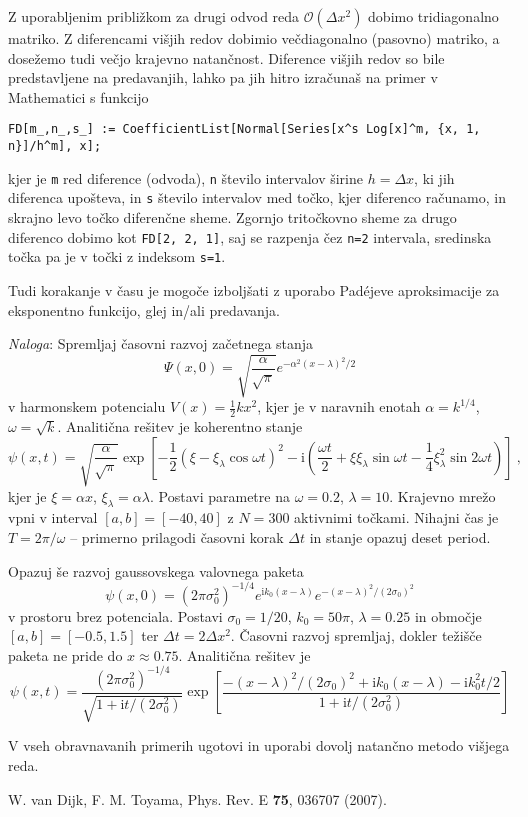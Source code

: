 \documentclass[slovene,11pt,a4paper]{article}
\newcommand{\ii}{\mathrm{i}}
\begin{document}
Z uporabljenim približkom za drugi odvod reda $\mathcal{O}(\Delta x^2)$ dobimo tridiagonalno matriko. Z diferencami višjih redov dobimio večdiagonalno (pasovno) matriko, a dosežemo tudi večjo krajevno natančnost. Diference višjih redov so bile predstavljene na predavanjih, lahko 
pa jih hitro izračunaš na primer v Mathematici s funkcijo
\begin{center}
  \tt FD[m_,n_,s_] := CoefficientList[Normal[Series[x\string^s Log[x]\string^m, \{x, 1, n\}]/h\string^m], x];
\end{center}
kjer je {\tt m} red diference (odvoda), {\tt n} število intervalov širine $h=\Delta x$, ki jih diferenca upošteva, in {\tt s} število intervalov med točko, kjer diferenco računamo, in skrajno levo točko diferenčne sheme. Zgornjo tritočkovno sheme za drugo diferenco dobimo kot {\tt FD[2, 2, 1]}, saj se razpenja čez {\tt n=2} intervala, sredinska točka pa je v točki z indeksom {\tt s=1}. 

Tudi korakanje v času je mogoče izboljšati z uporabo Pad\'ejeve aproksimacije za eksponentno funkcijo, glej \cite{dijk} in/ali predavanja. 


{\it Naloga\/}: Spremljaj časovni razvoj začetnega stanja
\begin{equation*}
  \Psi(x,0)=\sqrt{\frac{\alpha}{\sqrt{\pi}}} e^{-\alpha^2 (x-\lambda)^2/2}
\end{equation*}
v harmonskem potencialu $V(x)=\frac12 kx^2$, kjer je v naravnih enotah $\alpha=k^{1/4}$, $\omega=\sqrt{k}$. Analitična rešitev je koherentno stanje
\begin{equation*}
  \psi(x,t)=\sqrt{\frac{\alpha}{\sqrt{\pi}}} \exp\left[-\frac12 \left(\xi-\xi_\lambda \cos\omega t\right)^2 - \ii \left(\frac{\omega t}{2}+\xi\xi_\lambda \sin\omega t - \frac14 \xi_\lambda^2 \sin 2 \omega t\right)\right]\>,
\end{equation*}
kjer je $\xi=\alpha x$, $\xi_\lambda=\alpha \lambda$. Postavi parametre na $\omega=0.2$, $\lambda=10$. Krajevno mrežo vpni v interval $[a,b]=[-40,40]$ z $N=300$ aktivnimi točkami. Nihajni čas je $T=2\pi/\omega$ -- primerno prilagodi časovni korak $\Delta t$ in stanje opazuj deset period.

Opazuj še razvoj gaussovskega valovnega paketa
\begin{equation*}
  \psi(x,0)=(2\pi \sigma_0^2)^{-1/4} e^{\ii k_0(x-\lambda)}e^{-(x-\lambda)^2/(2\sigma_0)^2}
\end{equation*}
v prostoru brez potenciala. Postavi $\sigma_0=1/20$, $k_0=50\pi$, $\lambda=0.25$ in območje $[a,b]=[-0.5,1.5]$ ter $\Delta t=2\Delta x^2$. Časovni razvoj spremljaj, dokler težišče paketa ne pride do $x\approx 0.75$. Analitična rešitev je
\begin{equation*}
  \psi(x,t)=\frac{(2\pi \sigma_0^2)^{-1/4}}{\sqrt{1+\ii t/(2\sigma_0^2)}} \exp\left[
    \frac{-(x-\lambda)^2/(2\sigma_0)^2+\ii k_0(x-\lambda)-\ii k_0^2 t/2}{1+\ii t/(2\sigma_0^2)}
    \right]
\end{equation*}

V vseh obravnavanih primerih ugotovi in uporabi dovolj natančno metodo višjega reda.


\begin{thebibliography}{99}
\setlength{\itemsep}{.2\itemsep}\setlength{\parsep}{.5\parsep}
 W. van Dijk, F. M. Toyama, Phys. Rev. E {\bf 75}, 036707 (2007).
\end{thebibliography}
\end{document}
